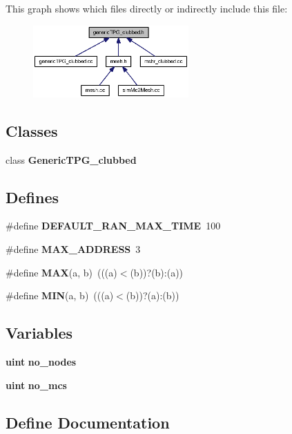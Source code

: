 This graph shows which files directly or indirectly include this file:\nopagebreak
\begin{figure}[H]
\begin{center}
\leavevmode
\includegraphics[width=169pt]{genericTPG__clubbed_8h__dep__incl}
\end{center}
\end{figure}
\subsection*{Classes}
\begin{CompactItemize}
\item 
class {\bf GenericTPG\_\-clubbed}
\end{CompactItemize}
\subsection*{Defines}
\begin{CompactItemize}
\item 
\#define {\bf DEFAULT\_\-RAN\_\-MAX\_\-TIME}~100
\item 
\#define {\bf MAX\_\-ADDRESS}~3
\item 
\#define {\bf MAX}(a, b)~(((a)$<$(b))?(b):(a))
\item 
\#define {\bf MIN}(a, b)~(((a)$<$(b))?(a):(b))
\end{CompactItemize}
\subsection*{Variables}
\begin{CompactItemize}
\item 
{\bf uint} {\bf no\_\-nodes}
\item 
{\bf uint} {\bf no\_\-mcs}
\end{CompactItemize}


\subsection{Define Documentation}
